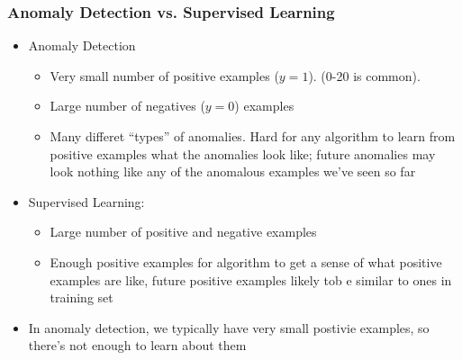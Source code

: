 \subsubsection{Anomaly Detection vs. Supervised Learning}
\begin{itemize}[--]
	\item Anomaly Detection
	\begin{itemize}[--]
		\item Very small number of positive examples ($y=1$). (0-20 is common).
		\item Large number of negatives ($y=0$) examples
		\item Many differet ``types'' of anomalies. Hard for any algorithm to learn from positive examples what the anomalies look like; future anomalies may look nothing like any of the anomalous examples we've seen so far
	\end{itemize}

	\item Supervised Learning:
	\begin{itemize}[--]
		\item Large number of positive and negative examples
		\item Enough positive examples for algorithm to get a sense of what positive examples are like, future positive examples likely tob e similar to ones in training set
	\end{itemize}

	\item In anomaly detection, we typically have very small postivie examples, so there's not enough to learn about them
\end{itemize}


